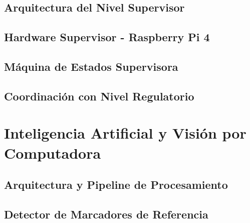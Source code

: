 \documentclass[a4paper,12pt]{report}
\begin{document}
\subsection{Arquitectura del Nivel Supervisor}


\subsection{Hardware Supervisor - Raspberry Pi 4}



\subsection{Máquina de Estados Supervisora}




\subsection{Coordinación con Nivel Regulatorio}




\section{Inteligencia Artificial y Visión por Computadora}

\subsection{Arquitectura y Pipeline de Procesamiento}
%
%

\subsection{Detector de Marcadores de Referencia}




\end{document}
